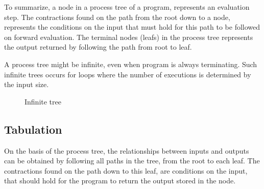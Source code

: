 \documentclass[10pt]{../sigplanconf}
\begin{document}
To summarize, a node in a process tree of a program, represents an
evaluation step. The contractions found on the path from the root down
to a node, represents the conditions on the input that must hold for
this path to be followed on forward evaluation. The terminal nodes
(leafs) in the process tree represents the output returned by
following the path from root to leaf.

A process tree might be infinite, even when program is always
terminating. Such infinite trees occurs for loops where the number of
executions is determined by the input size.

\begin{figure}
  \centering

  \caption{Infinite tree}
  \label{fig:inftree}
\end{figure}

\subsection{Tabulation}
On the basis of the process tree, the relationships between inputs and
outputs can be obtained by following all paths in the tree, from the
root to each leaf. The contractions found on the path down to this
leaf, are conditions on the input, that should hold for the program to
return the output stored in the node.
\end{document}
